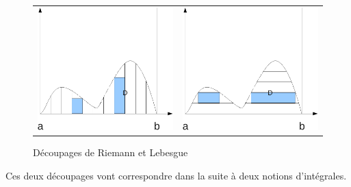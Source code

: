 \begin{figure}
\begin{tabular}{cc}
\includegraphics[scale=0.4]{images/graphe_riemann.pdf} & 
\includegraphics[scale=0.4]{images/graphe_lebesgue.pdf}
\end{tabular}
\caption{Découpages de Riemann et Lebesgue}\label{fig:01_02}
\end{figure}
Ces deux découpages vont correspondre dans la suite à deux notions
d'intégrales.


